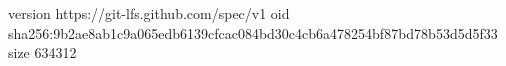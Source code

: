 version https://git-lfs.github.com/spec/v1
oid sha256:9b2ae8ab1c9a065edb6139cfcac084bd30c4cb6a478254bf87bd78b53d5d5f33
size 634312
